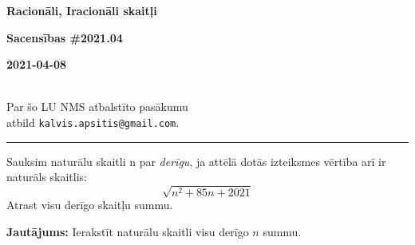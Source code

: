\documentclass[a4paper,12pt]{article}
\newcommand\answer[1]{}
\begin{document}
\begin{center}
\parbox{3.5cm}{\flushleft\bf Racionāli, Iracionāli skaitļi} \hfill {\bf\LARGE Sacensības \#2021.04} \hfill \parbox{3.5cm}{\flushright\bf 2021-04-08} \\[2pt]
{\rm\footnotesize Par šo LU NMS atbalstīto pasākumu\\ atbild {\tt kalvis.apsitis@gmail.com}.}
\end{center}

\hrule

\vspace{10pt}
\begin{problem}
Sauksim naturālu skaitli n par {\em derīgu}, ja attēlā dotās izteiksmes vērtība arī ir naturāls skaitlis: 
\[ \sqrt{n^2 + 85n + 2021} \]
Atrast visu derīgo skaitļu summu.

{\bf Jautājums:} Ierakstīt naturālu skaitli \textendash{} visu derīgo $n$ summu.
\answer{

{\bf Atbilde.} $\mathtt{172}$

Pareizinām izteiksmi zem saknes ar $4$, lai būtu vieglāk (bez dalīšanas ar $2$) atdalīt pilno kvadrātu. 
$\sqrt{n^2 + 85n + 2021}$ ir vesels skaitlis tad un tikai tad, ja $\sqrt{4n^2 + 340n + 8084}$ ir vesels
skaitlis jeb $4n^2 + 340n + 8084$ ir pilns kvadrāts $k^2$. Pārrakstām:

\[ 4n^2 + 340n + 8084 = k^2, \]
\[ (2n+85)^2 - 85^2 + 8084 = k^2, \]
\[ (2n+85)^2 + 859 = k^2, \]
Ievērosim, ka $(2n+85)^2 < k^2$ un arī $2n+85 < k$. Atņemam no lielākā pilnā kvadrāta mazāko un dalām reizinātājos:
\[ k^2 - (2n+85)^2 = 859, \]
\[ (k - (2n+85))(k + (2n+85)) = 859. \]
Tā kā $859$ ir pirmskaitlis, to var izteikt naturālu skaitļu reizinājumā tikai vienā veidā:
\[ \left\{ \begin{array}{l} 
k - (2n + 85) = 1,\\
k + (2n + 85) = 859.\\
\end{array} \right. \]
Reizinātāju $1$ un $859$ secību mainīt nevar, jo $k-(2n+85)$ ir mazāks par $k+(2n+85)$. 

Atņemam vienādojumus vienu no otra:
\[ (2n + 85) = \frac{859 - 1}{2} = 429. \]
Tāpēc $2n = 344$ un $n = 172$. 

Var arī pārbaudīt, ja $n = 172$:
\[ \sqrt{n^2 +85n + 2021} = \sqrt{172^2 + 85 \cdot 172 + 2021} = 215. \]
}
\end{problem}
\end{document}
